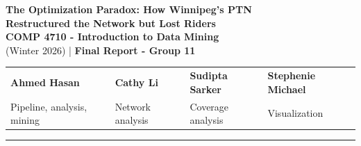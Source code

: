 \documentclass[11pt]{article}
\begin{document}
\small
\begin{center}
    {\LARGE \textbf{The Optimization Paradox: How Winnipeg's PTN\\
    Restructured the Network but Lost Riders}}\\[0.4em]
    {\large \textbf{COMP 4710 - Introduction to Data Mining}}\\
    {\large (Winter 2026) | \textbf{Final Report - Group 11}}
\end{center}
\thispagestyle{fancy}

\vspace{-0.3em}
\begin{tabularx}{\textwidth}{@{}XXXX@{}}
\textbf{Ahmed Hasan} & \textbf{Cathy Li} & \textbf{Sudipta Sarker} & \textbf{Stephenie Michael}\\
Pipeline, analysis, mining & Network analysis & Coverage analysis & Visualization
\end{tabularx}

\vspace{0.3em}\hrule\vspace{0.5em}
\end{document}
